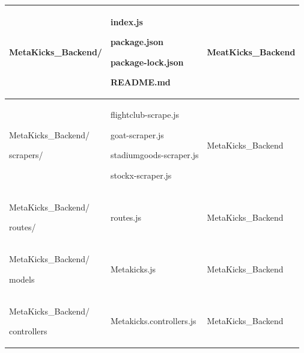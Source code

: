 \documentclass[conference]{IEEEtran}
\begin{document}
\begin{table}
\begin{tabular}{|p{2.8cm}|p{2.4cm}|p{2.7cm}|}\hline
	MetaKicks\_Backend/ & index.js \par package.json \par package-lock.json \par README.md \par & MeatKicks\_Backend\\ \hline
	MetaKicks\_Backend/\par scrapers/ & flightclub-scrape.js \par goat-scraper.js \par stadiumgoods-scraper.js \par stockx-scraper.js & MetaKicks\_Backend\\ \hline
	MetaKicks\_Backend/\par routes/ & routes.js & MetaKicks\_Backend\\ \hline
	MetaKicks\_Backend/\par models & Metakicks.js & MetaKicks\_Backend\\ \hline
	MetaKicks\_Backend/\par controllers & Metakicks.controllers.js & MetaKicks\_Backend\\ \hline
	\end{tabular}
\end{table}
\end{document}
